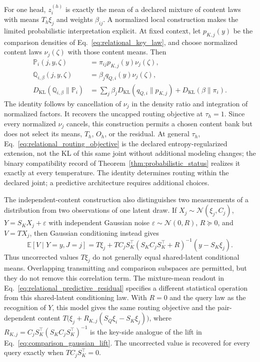 \documentclass[twoside,11pt]{article}
\begin{document}
For one head, $z_i^{(h)}$ is exactly the mean of a declared mixture of content laws with means $T_h\xi_j$ and weights $\beta_{ij}$. A normalized local construction makes the limited probabilistic interpretation explicit. At fixed context, let $p_{K,j}(y)$ be the comparison densities of Eq.~\eqref{eq:relational_key_law}, and choose normalized content laws $\nu_j(\zeta)$ with those content means. Then
\begin{align}
\mathbb P_i(j,y,\zeta)&=\pi_{ij}p_{K,j}(y)\nu_j(\zeta),\\
\mathbb Q_{i,\beta}(j,y,\zeta)&=\beta_jq_{Q,i}(y)\nu_j(\zeta),\\
D_{\mathrm{KL}}(\mathbb Q_{i,\beta}\|\mathbb P_i)
&=\sum_j\beta_jD_{\mathrm{KL}}(q_{Q,i}\|p_{K,j})
+D_{\mathrm{KL}}(\beta\|\pi_i).
\label{eq:relational_normalized_model}
\end{align}
The identity follows by cancellation of $\nu_j$ in the density ratio and integration of normalized factors. It recovers the uncapped routing objective at $\tau_h=1$. Since every normalized $\nu_j$ cancels, this construction permits a chosen content bank but does not select its means, $T_h$, $O_h$, or the residual. At general $\tau_h$, Eq.~\eqref{eq:relational_routing_objective} is the declared entropy-regularized extension, not the KL of this same joint without additional modeling changes; the binary compatibility record of Theorem~\ref{thm:probabilistic_status} realizes it exactly at every temperature. The identity determines routing within the declared joint; a predictive architecture requires additional choices.

The independent-content construction also distinguishes two measurements of a distribution from two observations of one latent draw. If $X_j\sim\mathcal N(\xi_j,C_j)$, $Y=S_KX_j+\varepsilon$ with independent Gaussian noise $\varepsilon\sim\mathcal N(0,R)$, $R\succeq0$, and $V=T X_j$, then Gaussian conditioning instead gives \citep{petersen2012matrix}
\begin{equation}
\mathbb E[V\mid Y=y,J=j]
=T\xi_j+TC_jS_K^\top(S_KC_jS_K^\top+R)^{-1}(y-S_K\xi_j).
\label{eq:relational_shared_latent_correction}
\end{equation}
Thus uncorrected values $T\xi_j$ do not generally equal shared-latent conditional means. Overlapping transmitting and comparison subspaces are permitted, but they do not remove this correlation term. The mixture-mean readout in Eq.~\eqref{eq:relational_predictive_residual} specifies a different statistical operation from this shared-latent conditioning law. With $R=0$ and the query law as the recognition of $Y$, this model gives the same routing objective and the pair-dependent content $T\bigl(\xi_j+R_{K,j}(S_Q\xi_i-S_K\xi_j)\bigr)$, where $R_{K,j}=C_jS_K^\top(S_KC_jS_K^\top)^{-1}$ is the key-side analogue of the lift in Eq.~\eqref{eq:comparison_gaussian_lift}. The uncorrected value is recovered for every query exactly when $TC_jS_K^\top=0$.
\end{document}
